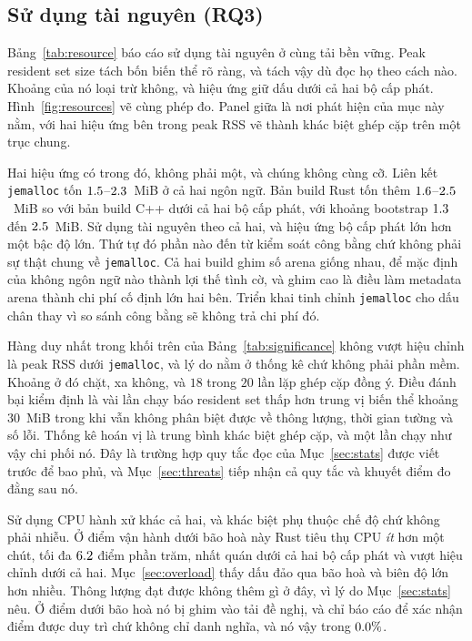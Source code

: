 \subsection{Sử dụng tài nguyên (RQ3)}\label{sec:resources}
Bảng~\ref{tab:resource} báo cáo sử dụng tài nguyên ở cùng
tải bền vững. Peak resident set size tách bốn biến thể rõ ràng, và tách vậy
dù đọc họ theo cách nào. Khoảng của nó loại trừ không, và hiệu ứng giữ dấu dưới
cả hai bộ cấp phát. Hình~\ref{fig:resources} vẽ cùng phép đo. Panel giữa là
nơi phát hiện của mục này nằm, với hai hiệu ứng bên trong peak RSS vẽ thành
khác biệt ghép cặp trên một trục chung.

Hai hiệu ứng có trong đó, không phải một, và chúng không cùng cỡ. Liên kết
\texttt{jemalloc} tốn $1.5$--$2.3$~MiB ở cả hai ngôn ngữ. Bản build Rust
tốn thêm $1.6$--$2.5$~MiB so với bản build C++ dưới cả hai bộ cấp phát,
với khoảng bootstrap $1.3$ đến $2.5$~MiB. Sử dụng tài nguyên theo cả hai, và
hiệu ứng bộ cấp phát lớn hơn một bậc độ lớn. Thứ tự đó phần nào đến từ
kiểm soát công bằng chứ không phải sự thật chung về \texttt{jemalloc}. Cả hai build ghim số arena
giống nhau, để mặc định của không ngôn ngữ nào thành lợi thế tình cờ, và
ghim cao là điều làm metadata arena thành chi phí cố định lớn hai bên. Triển khai
tinh chỉnh \texttt{jemalloc} cho dấu chân thay vì so sánh công bằng sẽ không trả chi phí đó.

Hàng duy nhất trong khối trên của Bảng~\ref{tab:significance} không vượt
hiệu chỉnh là peak RSS dưới
\texttt{jemalloc}, và lý do nằm ở thống kê chứ không phải phần mềm.
Khoảng ở đó chặt, xa không, và $18$ trong $20$ lần lặp ghép cặp đồng ý. Điều đánh bại kiểm định là vài lần chạy báo resident set thấp hơn trung vị biến thể khoảng $30$~MiB
trong khi vẫn không phân biệt được về thông lượng, thời gian tường và số lỗi. Thống kê
hoán vị là trung bình khác biệt ghép cặp, và một lần chạy như vậy chi phối nó. Đây là trường hợp
quy tắc đọc của Mục~\ref{sec:stats} được viết trước để bao phủ, và
Mục~\ref{sec:threats} tiếp nhận cả quy tắc và khuyết điểm đo đằng sau nó.

Sử dụng CPU hành xử khác cả hai, và khác biệt phụ thuộc chế độ chứ không
phải nhiễu. Ở điểm vận hành dưới bão hoà này Rust tiêu thụ CPU \emph{ít} hơn một chút, tối đa
$6.2$ điểm phần trăm, nhất quán dưới cả hai bộ cấp phát và vượt
hiệu chỉnh dưới cả hai. Mục~\ref{sec:overload} thấy dấu đảo qua bão hoà và
biên độ lớn hơn nhiều. Thông lượng đạt được không thêm gì ở đây, vì lý do
Mục~\ref{sec:stats} nêu. Ở điểm dưới bão hoà nó bị ghim vào tải đề nghị, và
chỉ báo cáo để xác nhận điểm được duy trì chứ không chỉ danh nghĩa, và nó vậy trong
$0.0\%$.

